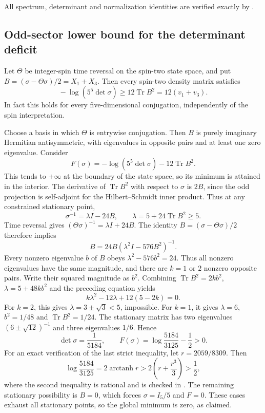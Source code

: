 \documentclass[11pt,a4paper]{article}
\newcommand{\Tr}{\operatorname{Tr}}
\begin{document}
All spectrum, determinant and normalization identities are verified
exactly by .



\subsection{Odd-sector lower bound for the determinant deficit}
Let $\Theta$ be integer-spin time reversal on the spin-two state space,
and put $B=(\sigma-\Theta\sigma)/2=X_1+X_3$.
Then every spin-two density matrix satisfies
\[
\boxed{\ -\log(5^5\det\sigma)\ge12\Tr B^2=12(v_1+v_3).\ }
\]
In fact this holds for every five-dimensional conjugation, independently
of the spin interpretation.

Choose a basis in which $\Theta$ is entrywise conjugation. Then $B$ is
purely imaginary Hermitian antisymmetric, with eigenvalues in opposite
pairs and at least one zero eigenvalue.
Consider
\[
F(\sigma)=-\log(5^5\det\sigma)-12\Tr B^2.
\]
This tends to $+\infty$ at the boundary of the state space, so its minimum
is attained in the interior. The derivative of $\Tr B^2$ with respect to
$\sigma$ is $2B$, since the odd projection is self-adjoint for the
Hilbert--Schmidt inner product. Thus at any constrained stationary point,
\[
\sigma^{-1}=\lambda I-24B,\qquad
\lambda=5+24\Tr B^2\ge5.
\]
Time reversal gives $(\Theta\sigma)^{-1}=\lambda I+24B$.
The identity $B=(\sigma-\Theta\sigma)/2$ therefore implies
\[
B=24B(\lambda^2I-576B^2)^{-1}.
\]
Every nonzero eigenvalue $b$ of $B$ obeys
$\lambda^2-576b^2=24$. Thus all nonzero eigenvalues have the same magnitude,
and there are $k=1$ or $2$ nonzero opposite pairs. Write their squared
magnitude as $b^2$. Combining
$\Tr B^2=2kb^2$, $\lambda=5+48kb^2$ and the preceding equation yields
\[
k\lambda^2-12\lambda+12(5-2k)=0.
\]
For $k=2$, this gives $\lambda=3\pm\sqrt3<5$, impossible.
For $k=1$, it gives $\lambda=6$, $b^2=1/48$ and $\Tr B^2=1/24$.
The stationary matrix has two eigenvalues $(6\pm\sqrt{12})^{-1}$ and
three eigenvalues $1/6$. Hence
\[
\det\sigma=\frac1{5184},\qquad
F(\sigma)=\log\frac{5184}{3125}-\frac12>0.
\]
For an exact verification of the last strict inequality, let
$r=2059/8309$. Then
\[
\log\frac{5184}{3125}=2\operatorname{arctanh}r
 >2\left(r+\frac{r^3}{3}\right)>\frac12,
\]
where the second inequality is rational and is checked in
.
The remaining stationary possibility is $B=0$, which forces
$\sigma=I_5/5$ and $F=0$. These cases exhaust all stationary points, so
the global minimum is zero, as claimed.
\end{document}
